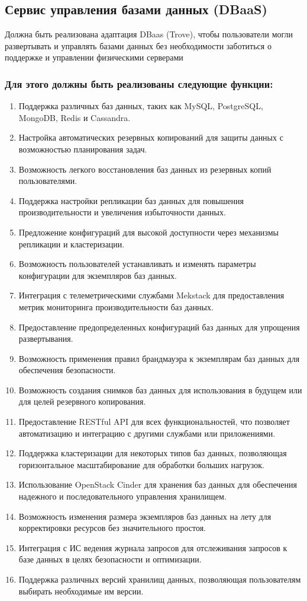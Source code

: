 \documentclass[14pt, a4paper]{extarticle}
\begin{document}
\subsection{Сервис управления базами данных (DBaaS)}

Должна быть реализована адаптация DBaas (Trove), чтобы пользователи могли развертывать и управлять базами данных без необходимости заботиться о поддержке и управлении физическими серверами

\subsubsection*{Для этого должны быть реализованы следующие функции:}

\begin{enumerate}
\item Поддержка различных баз данных, таких как MySQL, PostgreSQL, MongoDB, Redis и Cassandra.
\item Настройка автоматических резервных копирований для защиты данных с возможностью планирования задач.
\item Возможность легкого восстановления баз данных из резервных копий пользователями.
\item Поддержка настройки репликации баз данных для повышения производительности и увеличения избыточности данных.
\item Предложение конфигураций для высокой доступности через механизмы репликации и кластеризации.
\item Возможность пользователей устанавливать и изменять параметры конфигурации для экземпляров баз данных.
\item Интеграция с телеметрическими службами Mekstack для предоставления метрик мониторинга производительности баз данных.
\item Предоставление предопределенных конфигураций баз данных для упрощения развертывания.
\item Возможность применения правил брандмауэра к экземплярам баз данных для обеспечения безопасности.
\item Возможность создания снимков баз данных для использования в будущем или для целей резервного копирования.
\item Предоставление RESTful API для всех функциональностей, что позволяет автоматизацию и интеграцию с другими службами или приложениями.
\item Поддержка кластеризации для некоторых типов баз данных, позволяющая горизонтальное масштабирование для обработки больших нагрузок.
\item Использование OpenStack Cinder для хранения баз данных для обеспечения надежного и последовательного управления хранилищем.
\item Возможность изменения размера экземпляров баз данных на лету для корректировки ресурсов без значительного простоя.
\item Интеграция с ИС ведения журнала запросов для отслеживания запросов к базе данных в целях безопасности и оптимизации.
\item Поддержка различных версий хранилищ данных, позволяющая пользователям выбирать необходимые им версии.
\end{enumerate}
\end{document}
